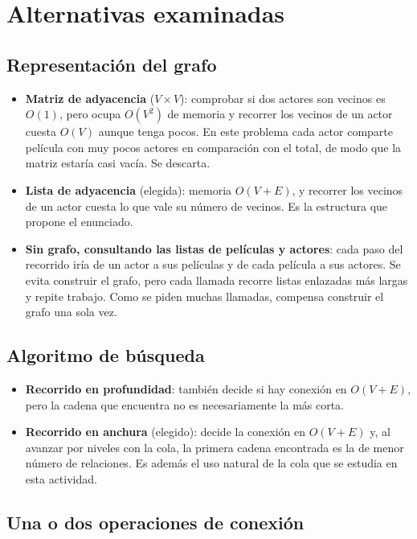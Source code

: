 \documentclass[a4paper,11pt]{report}
\begin{document}
\section{Alternativas examinadas}

\subsection{Representación del grafo}

\begin{itemize}
    \item \textbf{Matriz de adyacencia} ($V \times V$): comprobar si dos actores son vecinos es $O(1)$, pero ocupa $O(V^2)$ de memoria y recorrer los vecinos de un actor cuesta $O(V)$ aunque tenga pocos. En este problema cada actor comparte película con muy pocos actores en comparación con el total, de modo que la matriz estaría casi vacía. Se descarta.
    \item \textbf{Lista de adyacencia} (elegida): memoria $O(V + E)$, y recorrer los vecinos de un actor cuesta lo que vale su número de vecinos. Es la estructura que propone el enunciado.
    \item \textbf{Sin grafo, consultando las listas de películas y actores}: cada paso del recorrido iría de un actor a sus películas y de cada película a sus actores. Se evita construir el grafo, pero cada llamada recorre listas enlazadas más largas y repite trabajo. Como se piden muchas llamadas, compensa construir el grafo una sola vez.
\end{itemize}

\subsection{Algoritmo de búsqueda}

\begin{itemize}
    \item \textbf{Recorrido en profundidad}: también decide si hay conexión en $O(V+E)$, pero la cadena que encuentra no es necesariamente la más corta.
    \item \textbf{Recorrido en anchura} (elegido): decide la conexión en $O(V+E)$ y, al avanzar por niveles con la cola, la primera cadena encontrada es la de menor número de relaciones. Es además el uso natural de la cola que se estudia en esta actividad.
\end{itemize}

\subsection{Una o dos operaciones de conexión}
\end{document}
